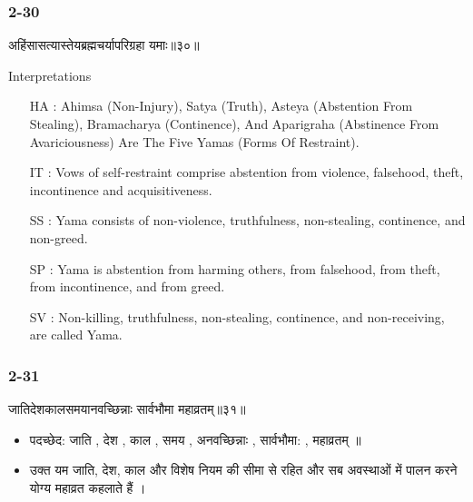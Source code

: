 \begin{frame}[fragile]\frametitle{2-30}
\begin{sanskrit}
अहिंसासत्यास्तेयब्रह्मचर्यापरिग्रहा यमाः॥३०॥
\end{sanskrit}

Interpretations
\begin{itemize}
\item [HA]: Ahimsa (Non-Injury), Satya (Truth), Asteya (Abstention From Stealing), Bramacharya (Continence), And Aparigraha (Abstinence From Avariciousness) Are The Five Yamas (Forms Of Restraint).
\item [IT]: Vows of self-restraint comprise abstention from violence, falsehood, theft, incontinence and acquisitiveness.
\item [SS]: Yama consists of non-violence, truthfulness, non-stealing, continence, and non-greed.
\item [SP]: Yama is abstention from harming others, from falsehood, from theft, from incontinence, and from greed.
\item [SV]: Non-killing, truthfulness, non-stealing, continence, and non-receiving, are called Yama. 
\end{itemize}

\end{frame}

\begin{frame}[fragile]\frametitle{2-31}
\begin{sanskrit}
जातिदेशकालसमयानवच्छिन्नाः सार्वभौमा महाव्रतम्॥३१॥
\end{sanskrit}

\begin{itemize}
\item पदच्छेद: जाति , देश , काल , समय , अनवच्छिन्नाः , सार्वभौमा: , महाव्रतम् ॥
\item उक्त यम जाति, देश, काल और विशेष नियम की सीमा से रहित और सब अवस्थाओं में पालन करने योग्य महाव्रत कहलाते हैं ।
\end{itemize}
	
\end{frame}

